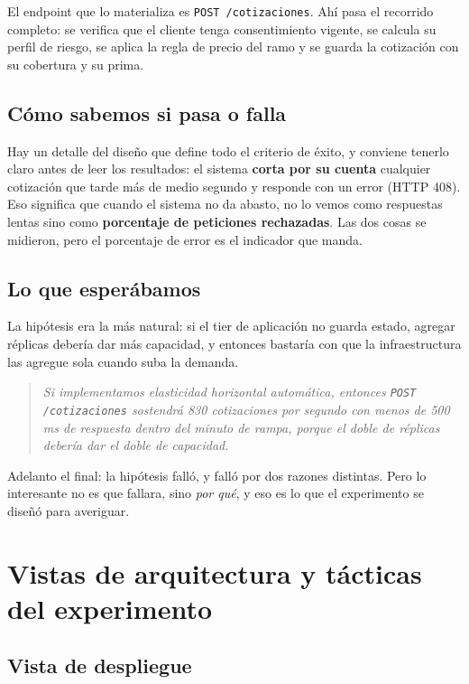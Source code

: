 \documentclass[11pt]{article}
\begin{document}
El endpoint que lo materializa es \texttt{POST /cotizaciones}. Ahí pasa el recorrido completo:
se verifica que el cliente tenga consentimiento vigente, se calcula su perfil de riesgo, se aplica
la regla de precio del ramo y se guarda la cotización con su cobertura y su prima.

\subsection{Cómo sabemos si pasa o falla}

Hay un detalle del diseño que define todo el criterio de éxito, y conviene tenerlo claro antes de
leer los resultados: el sistema \textbf{corta por su cuenta} cualquier cotización que tarde más de
medio segundo y responde con un error (HTTP 408). Eso significa que cuando el sistema no da abasto,
no lo vemos como respuestas lentas sino como \textbf{porcentaje de peticiones rechazadas}. Las dos
cosas se midieron, pero el porcentaje de error es el indicador que manda.

\subsection{Lo que esperábamos}

La hipótesis era la más natural: si el tier de aplicación no guarda estado, agregar réplicas
debería dar más capacidad, y entonces bastaría con que la infraestructura las agregue sola cuando
suba la demanda.

\begin{quote}
\textit{Si implementamos elasticidad horizontal automática, entonces \texttt{POST /cotizaciones}
sostendrá 830 cotizaciones por segundo con menos de 500 ms de respuesta dentro del minuto de rampa,
porque el doble de réplicas debería dar el doble de capacidad.}
\end{quote}

Adelanto el final: la hipótesis falló, y falló por dos razones distintas. Pero lo interesante no es
que fallara, sino \textit{por qué}, y eso es lo que el experimento se diseñó para averiguar.

\section{Vistas de arquitectura y tácticas del experimento}

\subsection{Vista de despliegue}
\end{document}
